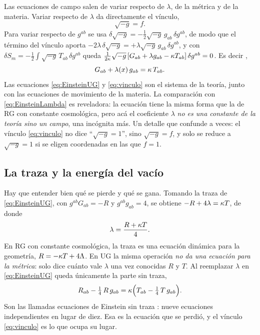 Las ecuaciones de campo salen de variar respecto de $\lambda$, de la métrica y de la materia. Variar respecto de $\lambda$ da directamente el vínculo,
\begin{equation}
\sqrt{-g}=f.
\label{eq:vinculo}
\end{equation}
Para variar respecto de $g^{ab}$ se usa $\delta\sqrt{-g}=-\tfrac12\sqrt{-g}\,g_{ab}\,\delta g^{ab}$, de modo que el término del vínculo aporta $-2\lambda\,\delta\sqrt{-g}=+\lambda\sqrt{-g}\,g_{ab}\,\delta g^{ab}$, y con $\delta S_m=-\tfrac12\int\sqrt{-g}\,T_{ab}\,\delta g^{ab}$ queda $\frac{1}{2\kappa}\sqrt{-g}\,[G_{ab}+\lambda g_{ab}-\kappa T_{ab}]\,\delta g^{ab}=0$. Es decir ,
\begin{equation}
G_{ab}+\lambda(x)\,g_{ab}=\kappa\,T_{ab}.
\label{eq:EinsteinUG}
\end{equation}
Las ecuaciones \eqref{eq:EinsteinUG} y \eqref{eq:vinculo} son el sistema de la teoría, junto con las ecuaciones de movimiento de la materia. La comparación con \eqref{eq:EinsteinLambda} es reveladora: la ecuación tiene la misma forma que la de RG con constante cosmológica, pero acá el coeficiente $\lambda$ \emph{no es una constante de la teoría sino un campo}, una incógnita más. Un detalle que confunde a veces: el vínculo \eqref{eq:vinculo} no dice ``$\sqrt{-g}=1$'', sino $\sqrt{-g}=f$, y solo se reduce a $\sqrt{-g}=1$ si se eligen coordenadas en las que $f=1$.

\subsection{La traza y la energía del vacío}

Hay que entender bien qué se pierde y qué se gana. Tomando la traza de \eqref{eq:EinsteinUG}, con $g^{ab}G_{ab}=-R$ y $g^{ab}g_{ab}=4$, se obtiene $-R+4\lambda=\kappa T$, de donde
\begin{equation}
\lambda=\frac{R+\kappa T}{4}.
\label{eq:lambdatraza}
\end{equation}
En RG con constante cosmológica, la traza es una ecuación dinámica para la geometría, $R=-\kappa T+4\Lambda$. En UG la misma operación \emph{no da una ecuación para la métrica}: solo dice cuánto vale $\lambda$ una vez conocidas $R$ y $T$. Al reemplazar $\lambda$ en \eqref{eq:EinsteinUG} queda únicamente la parte sin traza,
\begin{equation}
R_{ab}-\tfrac14\,R\,g_{ab}=\kappa\Big(T_{ab}-\tfrac14\,T\,g_{ab}\Big).
\label{eq:trazafree}
\end{equation}
Son las llamadas ecuaciones de Einstein sin traza \cite{ellis11,ellis14}: nueve ecuaciones independientes en lugar de diez. Esa es la ecuación que se perdió, y el vínculo \eqref{eq:vinculo} es lo que ocupa su lugar.

